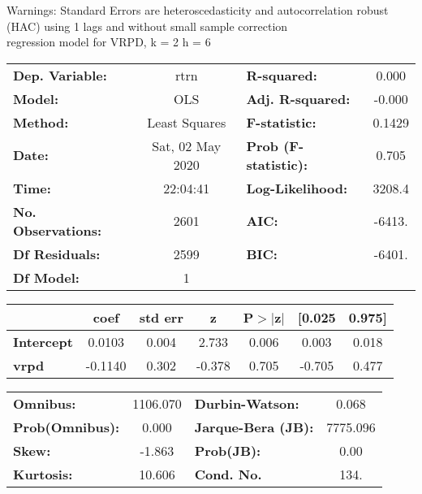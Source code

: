 Warnings: \newline
 [1] Standard Errors are heteroscedasticity and autocorrelation robust (HAC) using 1 lags and without small sample correction\\ 

regression model for VRPD, k = 2 h = 6\begin{center}
\begin{tabular}{lclc}
\toprule
\textbf{Dep. Variable:}    &       rtrn       & \textbf{  R-squared:         } &     0.000   \\
\textbf{Model:}            &       OLS        & \textbf{  Adj. R-squared:    } &    -0.000   \\
\textbf{Method:}           &  Least Squares   & \textbf{  F-statistic:       } &    0.1429   \\
\textbf{Date:}             & Sat, 02 May 2020 & \textbf{  Prob (F-statistic):} &    0.705    \\
\textbf{Time:}             &     22:04:41     & \textbf{  Log-Likelihood:    } &    3208.4   \\
\textbf{No. Observations:} &        2601      & \textbf{  AIC:               } &    -6413.   \\
\textbf{Df Residuals:}     &        2599      & \textbf{  BIC:               } &    -6401.   \\
\textbf{Df Model:}         &           1      & \textbf{                     } &             \\
\bottomrule
\end{tabular}
\begin{tabular}{lcccccc}
                   & \textbf{coef} & \textbf{std err} & \textbf{z} & \textbf{P$> |$z$|$} & \textbf{[0.025} & \textbf{0.975]}  \\
\midrule
\textbf{Intercept} &       0.0103  &        0.004     &     2.733  &         0.006        &        0.003    &        0.018     \\
\textbf{vrpd}      &      -0.1140  &        0.302     &    -0.378  &         0.705        &       -0.705    &        0.477     \\
\bottomrule
\end{tabular}
\begin{tabular}{lclc}
\textbf{Omnibus:}       & 1106.070 & \textbf{  Durbin-Watson:     } &    0.068  \\
\textbf{Prob(Omnibus):} &   0.000  & \textbf{  Jarque-Bera (JB):  } & 7775.096  \\
\textbf{Skew:}          &  -1.863  & \textbf{  Prob(JB):          } &     0.00  \\
\textbf{Kurtosis:}      &  10.606  & \textbf{  Cond. No.          } &     134.  \\
\bottomrule
\end{tabular}
\end{center}

